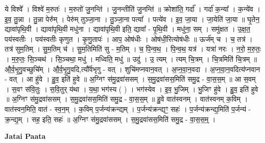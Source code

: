 \documentclass[17pt]{extarticle}
\begin{document}
ये विश्वे᳚ । विश्वे॑ म॒रुतः॑ । म॒रुतो॑ जु॒नन्ति॑ । जु॒नन्तीति॑ जु॒नन्ति॑ ॥ क्रोशा॑ति॒ गर्दा᳚ । गर्दा॑ क॒न्या᳚ । क॒न्ये॑व । इ॒व॒ तु॒न्ना । तु॒न्ना पेरु᳚म् । पेरु॑म् तुञ्जा॒ना । तु॒ञ्जा॒ना पत्या᳚ । पत्ये॑व । इ॒व॒ जा॒या । जा॒येति॑ जा॒या ॥ घृ॒तेन॒ द्यावा॑पृथि॒वी । द्यावा॑पृथि॒वी मधु॑ना । द्यावा॑पृथि॒वी इति॒ द्यावा᳚ - पृ॒थि॒वी । मधु॑ना॒ सम् । समु॑क्षत । उ॒क्ष॒त॒ पय॑स्वतीः । पय॑स्वतीः कृणुत । कृ॒णु॒तापः॑ । आप॒ ओष॑धीः । ओष॑धी॒रित्योष॑धीः ॥ ऊर्ज॑म् च । च॒ तत्र॑ । तत्र॑ सुम॒तिम् । सु॒म॒तिम् च॑ । सु॒म॒तिमिति॑ सु - म॒तिम् । च॒ पि॒न्व॒थ॒ । पि॒न्व॒थ॒ यत्र॑ । यत्रा॑ नरः । न॒रो॒ म॒रु॒तः॒ । म॒रु॒तः॒ सि॒ञ्चथ॑ । सि॒ञ्चथा॒ मधु॑ । मध्विति॒ मधु॑ ॥ उदु॑ । उ॒ त्यम् । त्यम् चि॒त्रम् । चि॒त्रमिति॑ चि॒त्रम् ॥ औ॒र्व॒भृ॒गु॒वच्छुचि᳚म् । औ॒र्व॒भृ॒गु॒वदि,त्यौ᳚र्वभृगु - वत् । शुचि॑मप्नवान॒वत् । अ॒प्न॒वा॒न॒वदा । अ॒प्न॒वा॒न॒वदित्य॑प्नवान - वत् । आ हु॑वे । हु॒व॒ इति॑ हुवे ॥ अ॒ग्निꣳ स॑मु॒द्रवा॑ससम् । स॒मु॒द्रवा॑सस॒मिति॑ समु॒द्र - वा॒स॒स॒म् ॥ आ स॒वम् । स॒वꣳ स॑वि॒तुः । स॒वि॒तुर् य॑था । य॒था॒ भग॑स्य ( ) । भग॑स्येव । इ॒व॒ भु॒जिम् । भु॒जिꣳ हु॑वे । हु॒व॒ इति॑ हुवे ॥ अ॒ग्निꣳ स॑मु॒द्रवा॑ससम् । स॒मु॒द्रवा॑सस॒मिति॑ समु॒द्र - वा॒स॒स॒म् ॥ हु॒वे वात॑स्वनम् । वात॑स्वनम् क॒विम् । वात॑स्वन॒मिति॒ वात॑ - स्व॒न॒म् । क॒विम् प॒र्जन्य॑क्रन्द्यम् । प॒र्जन्य॑क्रन्द्यꣳ॒॒ सहः॑ । प॒र्जन्य॑क्रन्द्य॒मिति॑ प॒र्जन्य॑ - क्र॒न्द्य॒म् । सह॒ इति॒ सहः॑ ॥ अ॒ग्निꣳ स॑मु॒द्रवा॑ससम् । स॒मु॒द्रवा॑सस॒मिति॑ समु॒द्र - वा॒स॒स॒म्॒ । \newline

\textbf{Jatai Paata} \newline
\end{document}
